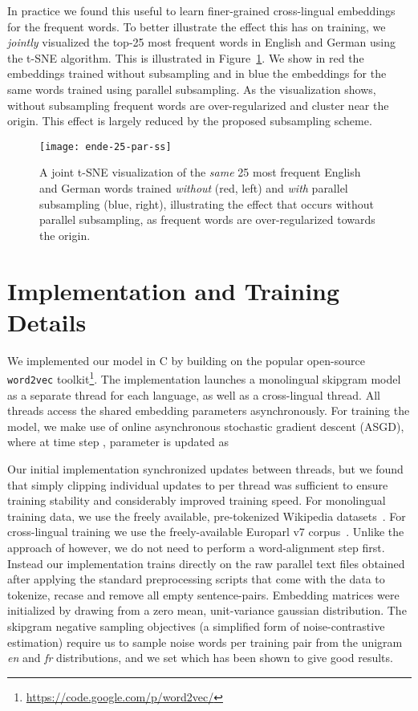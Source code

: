 \documentclass[10pt]{article}
\begin{document}
In practice we found this useful to learn finer-grained cross-lingual embeddings
for the frequent words. To better illustrate the effect this has on training,
we \emph{jointly} visualized the top-25
most frequent words in English and German using the t-SNE algorithm. This is
illustrated in Figure~\ref{fig:subsample}.  We show in red the embeddings
trained without subsampling and in blue the embeddings for the same words trained 
using parallel subsampling. As the visualization shows, without subsampling frequent words are
over-regularized and cluster near the origin. This effect is largely reduced by
the proposed subsampling scheme.

\begin{figure}
  \centering
\texttt{[image: ende-25-par-ss]} 
    \caption{A joint t-SNE visualization of the \emph{same} 25 most frequent English and German
  words trained \emph{without} (red, left) and \emph{with} parallel subsampling (blue, right),
  illustrating the effect that occurs without parallel subsampling,
  as frequent words are over-regularized towards the origin.}
   \label{fig:subsample}
\end{figure}

\section{Implementation and Training Details}
We implemented our model in C by building on the popular open-source
\texttt{word2vec} toolkit\footnote{\url{https://code.google.com/p/word2vec/}}.
The implementation launches a monolingual skipgram model as a separate thread
for each language, as well as a cross-lingual thread. All threads access
the shared embedding parameters asynchronously. For training the model, we make
use of online asynchronous stochastic gradient descent (ASGD), where
at time step , parameter  is updated as 

Our initial implementation synchronized updates between threads, but we found
that simply clipping individual updates to  per thread was sufficient to
ensure training stability and considerably improved training speed.  For
monolingual training data, we use the freely available, pre-tokenized
Wikipedia datasets~\cite{polyglot2013}. For cross-lingual training we use the
freely-available Europarl v7 corpus~\cite{koehn2005europarl}. Unlike
the approach of \cite{klementiev2012} however, we do not need to perform a word-alignment step
first. Instead our implementation trains directly on the raw parallel text
files obtained after applying the standard preprocessing scripts that come with
the data to tokenize, recase and remove all empty sentence-pairs. Embedding
matrices were initialized by drawing from a zero mean, unit-variance gaussian
distribution. The skipgram negative sampling objectives (a simplified form
of noise-contrastive estimation) require us to sample  noise words per training 
pair from the unigram  \emph{en} and \emph{fr}  distributions, and we 
set  which has been shown to give good results.
\end{document}
